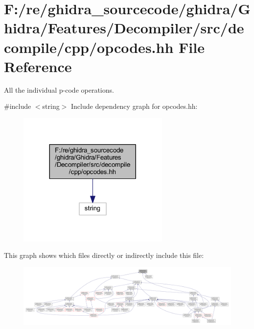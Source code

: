 \hypertarget{opcodes_8hh}{}\section{F\+:/re/ghidra\+\_\+sourcecode/ghidra/\+Ghidra/\+Features/\+Decompiler/src/decompile/cpp/opcodes.hh File Reference}
\label{opcodes_8hh}


All the individual p-\/code operations.  


{\ttfamily \#include $<$string$>$}\newline
Include dependency graph for opcodes.\+hh\+:
\nopagebreak
\begin{figure}[H]
\begin{center}
\leavevmode
\includegraphics[width=212pt]{opcodes_8hh__incl}
\end{center}
\end{figure}
This graph shows which files directly or indirectly include this file\+:
\nopagebreak
\begin{figure}[H]
\begin{center}
\leavevmode
\includegraphics[width=350pt]{opcodes_8hh__dep__incl}
\end{center}
\end{figure}
